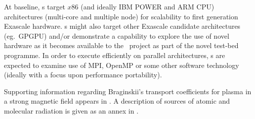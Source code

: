 At baseline, \papp s target $x86$ (and ideally IBM POWER and ARM 
CPU) architectures (multi-core and multiple node) for scalability to first 
generation Exascale hardware. \Papp s might also target other 
Exascale candidate architectures (eg.\ GPGPU) and/or demonstrate a capability to 
explore the use of novel hardware as it becomes available to the \exc \   
project as part of the novel test-bed programme. In order to execute
efficiently on parallel architectures, \papp s are expected to examine
use of MPI, OpenMP or some other software technology
(ideally with a focus upon performance portability).


Supporting information regarding Braginskii's transport
coefficients for plasma in a strong magnetic field appears in .
A description of sources of atomic and molecular radiation is given as an
annex in \Sec{atomic}.
